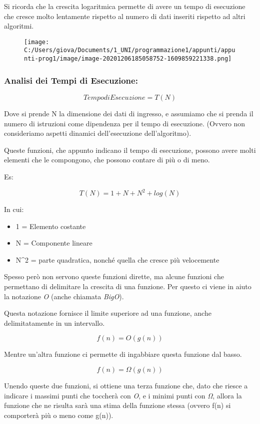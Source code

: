 \documentclass[
]{article}
\begin{document}
Si ricorda che la crescita logaritmica permette di avere un tempo di
esecuzione che cresce molto lentamente rispetto al numero di dati
inseriti rispetto ad altri algoritmi.

\begin{figure}
\centering
\texttt{[image: C:/Users/giova/Documents/1\_UNI/programmazione1/appunti/appunti-prog1/image/image-20201206185058752-1609859221338.png]}
\caption{}
\end{figure}

\hypertarget{header-n1571}{%
\subsubsection{Analisi dei Tempi di Esecuzione:}\label{header-n1571}}

\[Tempo di Esecuzione = T(N)\]

Dove si prende N la dimensione dei dati di ingresso, e assumiamo che si
prenda il numero di istruzioni come dipendenza per il tempo di
esecuzione. (Ovvero non consideriamo aspetti dinamici dell'esecuzione
dell'algoritmo).

Queste funzioni, che appunto indicano il tempo di esecuzione, possono
avere molti elementi che le compongono, che possono contare di più o di
meno.

Es:

\[T(N) = 1 + N + N^2 + log(N)\]

In cui:

\begin{itemize}
\item
  1 = Elemento costante
\item
  N = Componente lineare
\item
  N\^{}2 = parte quadratica, nonché quella che cresce più velocemente
\end{itemize}

Spesso però non servono queste funzioni dirette, ma alcune funzioni che
permettano di delimitare la crescita di una funzione. Per questo ci
viene in aiuto la notazione \emph{O} (anche chiamata \emph{BigO}).

Questa notazione fornisce il limite superiore ad una funzione, anche
delimitatamente in un intervallo.

\[f(n) = O(g(n))\]

Mentre un'altra funzione ci permette di ingabbiare questa funzione dal
basso.

\[f(n) = Ω(g(n))\]

Unendo queste due funzioni, si ottiene una terza funzione che, dato che
riesce a indicare i massimi punti che toccherà con \emph{O}, e i minimi
punti con \emph{Ω}, allora la funzione che ne risulta sarà una stima
della funzione stessa (ovvero f(n) si comporterà più o meno come g(n)).
\end{document}

